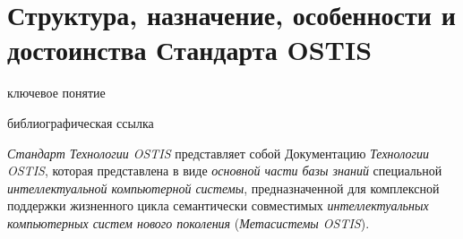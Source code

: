 \section{Структура, назначение, особенности и достоинства Стандарта OSTIS}
\label{sec_standard}

\begin{scnrelfromlist}{ключевое понятие}
\end{scnrelfromlist}

\begin{scnrelfromlist}{библиографическая ссылка}
\end{scnrelfromlist}

\textit{Стандарт Технологии OSTIS} представляет собой Документацию \textit{Технологии OSTIS}, которая представлена в виде \textit{основной части базы знаний} специальной \textit{интеллектуальной компьютерной системы}, предназначенной для комплексной поддержки жизненного цикла семантически совместимых \textit{интеллектуальных компьютерных систем нового поколения} (\textit{Метасистемы OSTIS}). 


